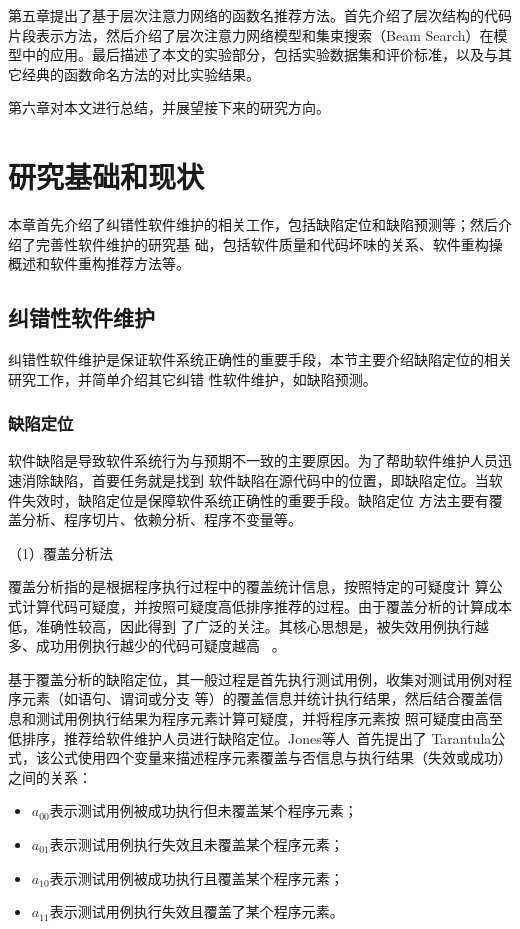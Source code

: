 第五章提出了基于层次注意力网络的函数名推荐方法。首先介绍了层次结构的代码片段表示方法，然后介绍了层次注意力网络模型和集束搜索（Beam Search）在模型中的应用。最后描述了本文的实验部分，包括实验数据集和评价标准，以及与其它经典的函数命名方法的对比实验结果。

第六章对本文进行总结，并展望接下来的研究方向。

\chapter{研究基础和现状}
本章首先介绍了纠错性软件维护的相关工作，包括缺陷定位和缺陷预测等；然后介绍了完善性软件维护的研究基
础，包括软件质量和代码坏味的关系、软件重构操概述和软件重构推荐方法等。
\section{纠错性软件维护}
纠错性软件维护是保证软件系统正确性的重要手段，本节主要介绍缺陷定位的相关研究工作，并简单介绍其它纠错
性软件维护，如缺陷预测。
\subsection{缺陷定位}
软件缺陷是导致软件系统行为与预期不一致的主要原因。为了帮助软件维护人员迅速消除缺陷，首要任务就是找到
软件缺陷在源代码中的位置，即缺陷定位。当软件失效时，缺陷定位是保障软件系统正确性的重要手段。缺陷定位
方法主要有覆盖分析、程序切片、依赖分析、程序不变量等。

（1）覆盖分析法

覆盖分析指的是根据程序执行过程中的覆盖统计信息，按照特定的可疑度计
算公式计算代码可疑度，并按照可疑度高低排序推荐的过程。由于覆盖分析的计算成本低，准确性较高，因此得到
了广泛的关注。其核心思想是，被失效用例执行越多、成功用例执行越少的代码可疑度越高
~\cite{jones2005empirical}。

基于覆盖分析的缺陷定位，其一般过程是首先执行测试用例，收集对测试用例对程序元素（如语句、谓词或分支
等）的覆盖信息并统计执行结果，然后结合覆盖信息和测试用例执行结果为程序元素计算可疑度，并将程序元素按
照可疑度由高至低排序，推荐给软件维护人员进行缺陷定位。Jones等人~\cite{jones2005empirical}首先提出了
Tarantula公式，该公式使用四个变量来描述程序元素覆盖与否信息与执行结果（失效或成功）之间的关系：
\begin{itemize}
  \item $a_{00}$表示测试用例被成功执行但未覆盖某个程序元素；
  \item $a_{01}$表示测试用例执行失效且未覆盖某个程序元素；
  \item $a_{10}$表示测试用例被成功执行且覆盖某个程序元素；
  \item $a_{11}$表示测试用例执行失效且覆盖了某个程序元素。
\end{itemize}

